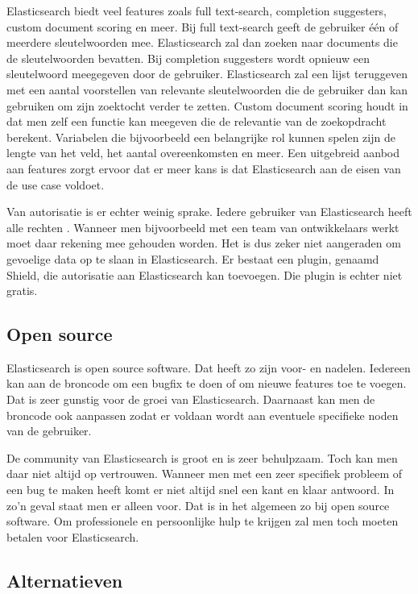 Elasticsearch biedt veel features zoals full text-search, completion suggesters, custom document scoring en meer. Bij full text-search geeft de gebruiker één of meerdere sleutelwoorden mee. Elasticsearch zal dan zoeken naar documents die de sleutelwoorden bevatten. Bij completion suggesters wordt opnieuw een sleutelwoord meegegeven door de gebruiker. Elasticsearch zal een lijst teruggeven met een aantal voorstellen van relevante sleutelwoorden die de gebruiker dan kan gebruiken om zijn zoektocht verder te zetten. Custom document scoring houdt in dat men zelf een functie kan meegeven die de relevantie van de zoekopdracht berekent. Variabelen die bijvoorbeeld een belangrijke rol kunnen spelen zijn de lengte van het veld, het aantal overeenkomsten en meer. Een uitgebreid aanbod aan features zorgt ervoor dat er meer kans is dat Elasticsearch aan de eisen van de use case voldoet. 

Van autorisatie is er echter weinig sprake. Iedere gebruiker van Elasticsearch heeft alle rechten \autocite{Brasetvik2013}. Wanneer men bijvoorbeeld met een team van ontwikkelaars werkt moet daar rekening mee gehouden worden. Het is dus zeker niet aangeraden om gevoelige data op te slaan in Elasticsearch. Er bestaat een plugin, genaamd Shield, die autorisatie aan Elasticsearch kan toevoegen. Die plugin is echter niet gratis. 

\subsection{Open source}

Elasticsearch is open source software. Dat heeft zo zijn voor- en nadelen. Iedereen kan aan de broncode om een bugfix te doen of om nieuwe features toe te voegen. Dat is zeer gunstig voor de groei van Elasticsearch. Daarnaast kan men de broncode ook aanpassen zodat er voldaan wordt aan eventuele specifieke noden van de gebruiker. \autocite{Tahir2008}

De community van Elasticsearch is groot en is zeer behulpzaam. Toch kan men daar niet altijd op vertrouwen. Wanneer men met een zeer specifiek probleem of een bug te maken heeft komt er niet altijd snel een kant en klaar antwoord. In zo'n geval staat men er alleen voor. Dat is in het algemeen zo bij open source software. Om professionele en persoonlijke hulp te krijgen zal men toch moeten betalen voor Elasticsearch.

\subsection{Alternatieven}

